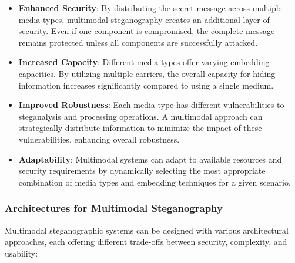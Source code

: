 \documentclass[12pt, a4paper, oneside]{book}
\begin{document}
\begin{itemize}[leftmargin=*]
    \item \textbf{Enhanced Security}: By distributing the secret message across multiple media types, multimodal steganography creates an additional layer of security. Even if one component is compromised, the complete message remains protected unless all components are successfully attacked.

    \item \textbf{Increased Capacity}: Different media types offer varying embedding capacities. By utilizing multiple carriers, the overall capacity for hiding information increases significantly compared to using a single medium.

    \item \textbf{Improved Robustness}: Each media type has different vulnerabilities to steganalysis and processing operations. A multimodal approach can strategically distribute information to minimize the impact of these vulnerabilities, enhancing overall robustness.

    \item \textbf{Adaptability}: Multimodal systems can adapt to available resources and security requirements by dynamically selecting the most appropriate combination of media types and embedding techniques for a given scenario.
\end{itemize}

\subsubsection{Architectures for Multimodal Steganography}
Multimodal steganographic systems can be designed with various architectural approaches, each offering different trade-offs between security, complexity, and usability:
\end{document}

